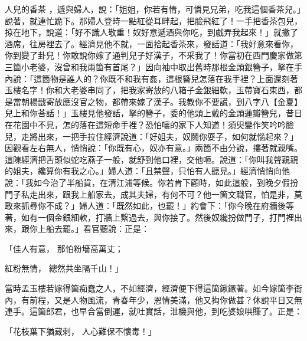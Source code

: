 \begin{showcontents}{}
人兒的香茶 ，遞與婦人，說：「姐姐，你若有情，可憐見兄弟，吃我這個香茶兒。」說著，就連忙跪下。那婦人登時一點紅從耳畔起，把臉飛紅了！一手把香茶包兒，掠在地下，說道：「好不識人敬重！奴好意遞酒與你吃，到戲弄我起來！」就撇了酒席，往房裡去了。經濟見他不就，一面拾起香茶來，發話道：「我好意來看你，你到變了卦兒！你敢說你嫁了通判兒子好漢子，不采我了！你當初在西門慶家做第三箇小老婆，沒曾和我兩箇有首尾？」因向袖中取出舊時那根金頭銀簪子，拏在手內說：「這箇物是誰人的？你既不和我有姦，這根簪兒怎落在我手裡？上面還刻著玉樓名字！你和大老婆串同了，把我家寄放的八箱子金銀細軟，玉帶寶石東西，都是當朝楊戩寄放應沒官之物，都帶來嫁了漢子。我教你不要謊，到八字八【金夏】兒上和你荅話！」玉樓見他發話，拏的簪子，委的他頭上戴的金頭蓮瓣簪兒，昔日在花園中不見，怎的落在這短命手裡？恐怕嚷的家下人知道！須臾變作笑吟吟臉兒，走將出來，一把手拉住經濟說道：「好姐夫，奴鬬你耍子，如何就惱起來？」因觀看左右無人，悄悄說：「你既有心，奴亦有意。」兩箇不由分說，摟著就親嘴。這陳經濟把舌頭似蛇吃燕子一般，就舒到他口裡，交他咂。說道：「你叫我聲親親的姐夫，纔算你有我之心。」婦人道：「且禁聲，只怕有人聽見。」經濟悄悄向他說：「我如今治了半船貨，在清江浦等候。你若肯下顧時，如此這般，到晚夕假扮門子私走出來，跟我上船家去，成其夫婦，有何不可？他一箇文職官，怕是非，莫敢來抓尋你不成？」婦人道：「既然如此，也罷！」約會下：「你今晚在府牆後等著，如有一個金銀細軟，打牆上繫過去，與你接了。然後奴纔扮做門子，打門裡出來，跟你上船去罷。」看官聽說：正是：

「佳人有意，  那怕粉墻高萬丈；

紅粉無情，  總然共坐隔千山！」

當時孟玉樓若嫁得箇痴蠢之人，不如經濟，經濟便下得這箇鍬鐝著。如今嫁箇李衙內，有前程，又是人物風流，青春年少，恩情美滿，他又抅你做甚？休說平日又無連手。這箇郎君，也早合當倒運，就吐實話，泄機與他，到吃婆娘哄賺了。正是：

「花枝葉下猶藏刺，  人心難保不懷毒！」


\end{showcontents}
